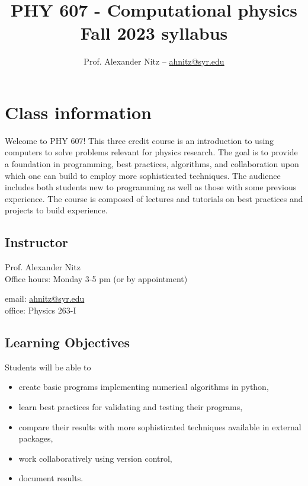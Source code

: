 \documentclass[12pt]{article}
\title{PHY 607 - Computational physics \\ Fall 2023 syllabus}
\author{Prof. Alexander Nitz -- \href{mailto:ahnitz@syr.edu}{ahnitz@syr.edu}}
\date{}
\begin{document}
\maketitle

\section*{Class information}

Welcome to PHY 607! This three credit course is an introduction to using computers to solve problems relevant for physics research. The goal is to provide a foundation in programming, best practices, algorithms, and collaboration upon which one can build to employ more sophisticated techniques. The audience includes both students new to programming as well as those with some previous experience. The course is composed of
lectures and tutorials on best practices and projects to build experience.

\subsection*{Instructor}

\begin{minipage}{0.5\textwidth}
  Prof. Alexander Nitz \\
  Office hours: Monday 3-5 pm (or by appointment)
\end{minipage}
\begin{minipage}{0.5\textwidth}
  \begin{flushright}
  email: \href{mailto:ahnitz@syr.edu}{ahnitz@syr.edu} \\
  office: Physics 263-I
  \end{flushright}
\end{minipage}

\subsection*{Learning Objectives}
Students will be able to
\begin{itemize}
\item create basic programs implementing numerical algorithms in python,
\item learn best practices for validating and testing their programs,
\item compare their results with more sophisticated techniques available in external packages,
\item work collaboratively using version control,
\item document results.
\end{itemize}
\end{document}
